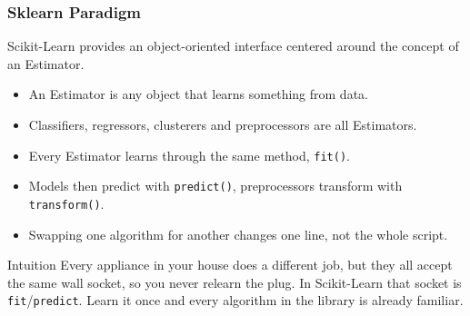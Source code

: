 %



\begin{frame}[fragile]\frametitle{Sklearn Paradigm}
Scikit-Learn provides an object-oriented interface centered around the concept of an Estimator.
\begin{itemize}
\item An Estimator is any object that learns something from data.
\item Classifiers, regressors, clusterers and preprocessors are all Estimators.
\item Every Estimator learns through the same method, \texttt{fit()}.
\item Models then predict with \texttt{predict()}, preprocessors transform with \texttt{transform()}.
\item Swapping one algorithm for another changes one line, not the whole script.
\end{itemize}

\begin{block}{Intuition}
Every appliance in your house does a different job, but they all accept the same wall socket, so you never relearn the plug. In Scikit-Learn that socket is \texttt{fit}/\texttt{predict}. Learn it once and every algorithm in the library is already familiar.
\end{block}
\end{frame}

